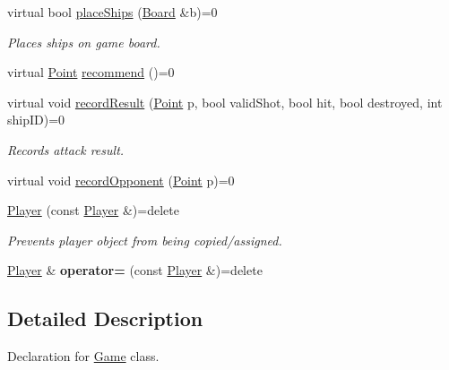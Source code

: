 \begin{DoxyCompactItemize}
\mbox{\label{class_player_ab89c1180c7314d3e19bcf4b2bed2e02a}} 
virtual bool \mbox{\hyperlink{class_player_ab89c1180c7314d3e19bcf4b2bed2e02a}{place\+Ships}} (\mbox{\hyperlink{class_board}{Board}} \&b)=0
\begin{DoxyCompactList}\small\item\em Places ships on game board. \end{DoxyCompactList}\item 
virtual \mbox{\hyperlink{class_point}{Point}} \mbox{\hyperlink{class_player_a2cc7a83d11158eafd8d49d4b9f23ce56}{recommend}} ()=0
\item 
\mbox{\label{class_player_a368527cfefaac58dc942b32658f977ed}} 
virtual void \mbox{\hyperlink{class_player_a368527cfefaac58dc942b32658f977ed}{record\+Result}} (\mbox{\hyperlink{class_point}{Point}} p, bool valid\+Shot, bool hit, bool destroyed, int ship\+ID)=0
\begin{DoxyCompactList}\small\item\em Records attack result. \end{DoxyCompactList}\item 
virtual void \mbox{\hyperlink{class_player_a768e14edee61e208e6fd295cdd72a49c}{record\+Opponent}} (\mbox{\hyperlink{class_point}{Point}} p)=0
\item 
\mbox{\label{class_player_ae8015d1f08ba69d663cfdaea1a64d1a4}} 
\mbox{\hyperlink{class_player_ae8015d1f08ba69d663cfdaea1a64d1a4}{Player}} (const \mbox{\hyperlink{class_player}{Player}} \&)=delete
\begin{DoxyCompactList}\small\item\em Prevents player object from being copied/assigned. \end{DoxyCompactList}\item 
\mbox{\label{class_player_ab81d34e4adb4e329d26b1635d866462d}} 
\mbox{\hyperlink{class_player}{Player}} \& {\bfseries operator=} (const \mbox{\hyperlink{class_player}{Player}} \&)=delete
\end{DoxyCompactItemize}


\subsection{Detailed Description}
Declaration for \mbox{\hyperlink{class_game}{Game}} class. 

